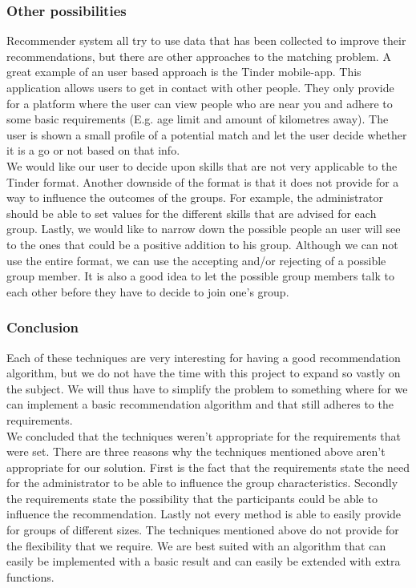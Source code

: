 \documentclass[]{article}
\begin{document}
\subsubsection{Other possibilities}
Recommender system all try to use data that has been collected to improve their recommendations, but there are other approaches to the matching problem.
A great example of an user based approach is the Tinder mobile-app.
This application allows users to get in contact with other people.
They only provide for a platform where the user can view people who are near you and adhere to some basic requirements (E.g. age limit and amount of kilometres away).
The user is shown a small profile of a potential match and let the user decide whether it is a go or not based on that info.\\
We would like our user to decide upon skills that are not very applicable to the Tinder format.
Another downside of the format is that it does not provide for a way to influence the outcomes of the groups.
For example, the administrator should be able to set values for the different skills that are advised for each group.
Lastly, we would like to narrow down the possible people an user will see to the ones that could be a positive addition to his group.
Although we can not use the entire format, we can use the accepting and/or rejecting of a possible group member.
It is also a good idea to let the possible group members talk to each other before they have to decide to join one's group.

\subsubsection{Conclusion}
Each of these techniques are very interesting for having a good recommendation algorithm, but we do not have the time with this project to expand so vastly on the subject.
We will thus have to simplify the problem to something where for we can implement a basic recommendation algorithm and that still adheres to the requirements.\\
We concluded that the techniques weren't appropriate for the requirements that were set.
There are three reasons why the techniques mentioned above aren't appropriate for our solution.
First is the fact that the requirements state the need for the administrator to be able to influence the group characteristics.
Secondly the requirements state the possibility that the participants could be able to influence the recommendation.
Lastly not every method is able to easily provide for groups of different sizes.
The techniques mentioned above do not provide for the flexibility that we require.
We are best suited with an algorithm that can easily be implemented with a basic result and can easily be extended with extra functions.
\end{document}
